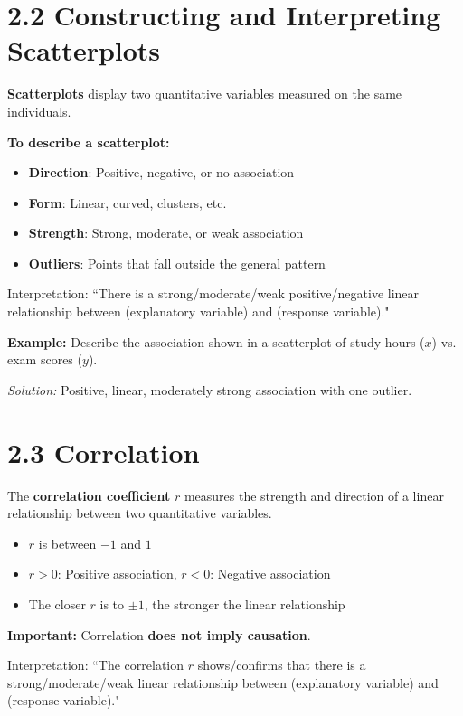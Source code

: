 \section*{2.2 Constructing and Interpreting Scatterplots}

\textbf{Scatterplots} display two quantitative variables measured on the same individuals.

\textbf{To describe a scatterplot:}
\begin{itemize}
    \item \textbf{Direction}: Positive, negative, or no association
    \item \textbf{Form}: Linear, curved, clusters, etc.
    \item \textbf{Strength}: Strong, moderate, or weak association
    \item \textbf{Outliers}: Points that fall outside the general pattern
\end{itemize}
Interpretation: ``There is a strong/moderate/weak positive/negative linear relationship between (explanatory variable) and (response variable)."

\begin{example}
\textbf{Example:} Describe the association shown in a scatterplot of study hours (\(x\)) vs. exam scores (\(y\)).

\textit{Solution:} Positive, linear, moderately strong association with one outlier.
\end{example}

\section*{2.3 Correlation}

The \textbf{correlation coefficient} \(r\) measures the strength and direction of a linear relationship between two quantitative variables.

\begin{itemize}
    \item \(r\) is between \(-1\) and \(1\)
    \item \(r>0\): Positive association, \quad \(r<0\): Negative association
    \item The closer \(r\) is to \(\pm1\), the stronger the linear relationship
\end{itemize}

\begin{warningBox}
\textbf{Important:} Correlation \textbf{does not imply causation}.
\end{warningBox}
Interpretation: ``The correlation $r$ shows/confirms that there is a strong/moderate/weak linear relationship between (explanatory variable) and (response variable)."

